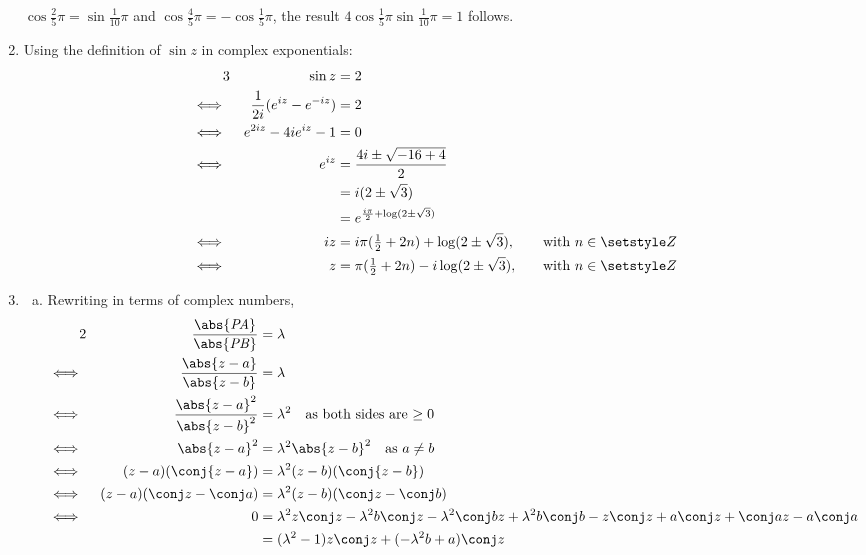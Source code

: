 \documentclass[fleqn,a4paper,11pt]{article}
\begin{document}
\begin{enumerate}
    \(\cos \frac 25 \pi = \sin \frac 1{10} \pi\) and
    \(\cos \frac 45 \pi = - \cos \frac 15 \pi\), the result
    \(4 \cos \frac 15 \pi \sin \frac 1{10} \pi = 1\) follows.
   \item Using the definition of \(\sin z\) in complex exponentials:
    \begin{alignat*}3
     && \sin z &= 2 \\
     \iff{}&& \frac 1{2i}(e^{iz} - e^{-iz}) &= 2 \\
     \iff{}&& e^{2iz} - 4ie^{iz} - 1 &= 0 \\
     \iff{}&& e^{iz} &= \frac{4i \pm \sqrt{-16 + 4}}{2} \\
     &&              &= i(2 \pm \sqrt 3) \\
     &&              &= e^{\frac{i\pi}2 + \log(2 \pm \sqrt 3)} \\
     \iff{}&& iz &= i\pi(\tfrac 12 + 2n) + \log(2 \pm \sqrt 3),
                    \quad &&\text{with \(n \in \Integers\)} \\
     \iff{}&& z &= \pi(\tfrac 12 + 2n) - i\log(2 \pm \sqrt 3),
                    \quad &&\text{with \(n \in \Integers\)}
    \end{alignat*}
   \item
    \begin{enumerate}[(a)]
     \item Rewriting in terms of complex numbers,
      {\setlength{\mathindent}{-2cm}
      \begin{alignat*}2
       && \frac{\abs{\lseg{PA}}}{\abs{\lseg{PB}}} &= \lambda \\
       \iff{}&& \frac{\abs{z - a}}{\abs{z - b}} &= \lambda \\
       \iff{}&& \frac{\abs{z - a}^2}{\abs{z - b}^2} &= \lambda^2 \quad
        \text{as both sides are \(\ge 0\)} \\
       \iff{}&& \abs{z - a}^2 &= \lambda^2\abs{z - b}^2 \quad
        \text{as \(a \ne b\)} \\
       \iff{}&& (z - a)(\conj{z - a}) &= \lambda^2(z - b)(\conj{z - b}) \\
       \iff{}&& (z - a)(\conj z - \conj a)
                 &= \lambda^2(z - b)(\conj z - \conj b) \\
       \iff{}&& 0 &= \lambda^2 z\conj z - \lambda^2 b \conj z
                     - \lambda^2 \conj b z
                     + \lambda^2 b \conj b - z \conj z + a \conj z
                     + \conj a z - a \conj a \\
       &&         &= (\lambda^2 - 1)z\conj z + (-\lambda^2 b + a)\conj z

\end{alignat*}}
\end{enumerate}
\end{enumerate}
\end{document}
